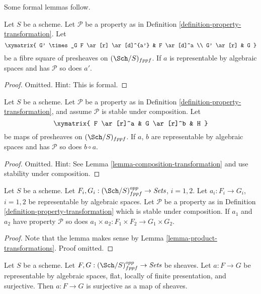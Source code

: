 \medskip\noindent
Some formal lemmas follow.

\begin{lemma}
\label{lemma-base-change-transformation-property}
Let $S$ be a scheme.
Let $\mathcal{P}$ be a property as in
Definition \ref{definition-property-transformation}.
Let
$$
\xymatrix{
G' \times_G F \ar[r] \ar[d]^{a'} & F \ar[d]^a \\
G' \ar[r] & G
}
$$
be a fibre square of presheaves on $(\Sch/S)_{fppf}$.
If $a$ is representable by algebraic spaces and has $\mathcal{P}$
so does $a'$.
\end{lemma}

\begin{proof}
Omitted. Hint: This is formal.
\end{proof}

\begin{lemma}
\label{lemma-composition-transformation-property}
Let $S$ be a scheme.
Let $\mathcal{P}$ be a property as in
Definition \ref{definition-property-transformation},
and assume $\mathcal{P}$ is stable under composition.
Let
$$
\xymatrix{
F \ar[r]^a & G \ar[r]^b & H
}
$$
be maps of presheaves on $(\Sch/S)_{fppf}$.
If $a$, $b$ are representable by algebraic spaces and has
$\mathcal{P}$ so does $b \circ a$.
\end{lemma}

\begin{proof}
Omitted. Hint: See
Lemma \ref{lemma-composition-transformation}
and use stability under composition.
\end{proof}

\begin{lemma}
\label{lemma-product-transformations-property}
Let $S$ be a scheme.
Let $F_i, G_i : (\Sch/S)_{fppf}^{opp} \to \textit{Sets}$,
$i = 1, 2$.
Let $a_i : F_i \to G_i$, $i = 1, 2$ be representable by algebraic spaces.
Let $\mathcal{P}$ be a property as in
Definition \ref{definition-property-transformation}
which is stable under composition.
If $a_1$ and $a_2$ have property $\mathcal{P}$ so does
$a_1 \times a_2 : F_1 \times F_2 \longrightarrow G_1 \times G_2$.
\end{lemma}

\begin{proof}
Note that the lemma makes sense by
Lemma \ref{lemma-product-transformations}.
Proof omitted.
\end{proof}

\begin{lemma}
\label{lemma-surjective-flat-locally-finite-presentation}
Let $S$ be a scheme.
Let $F, G : (\Sch/S)_{fppf}^{opp} \to \textit{Sets}$ be sheaves.
Let $a : F \to G$ be representable by algebraic spaces, flat,
locally of finite presentation, and surjective.
Then $a : F \to G$ is surjective as a map of sheaves.
\end{lemma}

